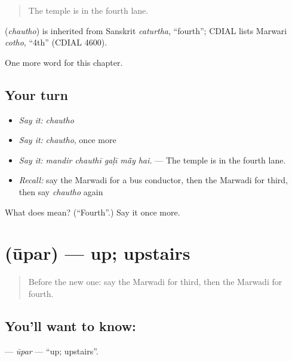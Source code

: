 \begin{quote}
The temple is in the fourth lane.
\end{quote}

\begin{cousinweb}
\textbf{} (\emph{chautho}) is inherited from Sanskrit \emph{caturtha}, \textquotedblleft{}fourth\textquotedblright{}; CDIAL lists Marwari \emph{cotho}, \textquotedblleft{}4th\textquotedblright{} (CDIAL 4600).
\end{cousinweb}

\begin{grammarlens}[title={What you've built}]
One more word for this chapter.
\end{grammarlens}

\subsection*{Your turn}
\begin{itemize}
\raggedright
  \item \emph{Say it:} \emph{chautho}
  \item \emph{Say it:} \emph{chautho}, once more
  \item \emph{Say it:} \emph{mandir chauthī gaḷī mā̃y hai.} — The temple is in the fourth lane.
  \item \emph{Recall:} say the Marwadi for a bus conductor, then the Marwadi for third, then say \emph{chautho} again
\end{itemize}

\begin{tcolorbox}[breakable,colback=teal!4,colframe=teal!35!black,title={Before you move on}]
What does  mean? (\textquotedblleft{}Fourth\textquotedblright{}.) Say it once more.
\end{tcolorbox}
\section[\texorpdfstring{\mw{ऊपर} (ūpar)}{ऊपर (ūpar)}]{ (ūpar) — up; upstairs}

\label{lesson:MW-C206-upar}



\begin{quote}
Before the new one: say the Marwadi for third, then the Marwadi for fourth.
\end{quote}

\subsection*{You'll want to know: }
\textbf{} — \emph{ūpar} — \textquotedblleft{}up; upstairs\textquotedblright{}.

